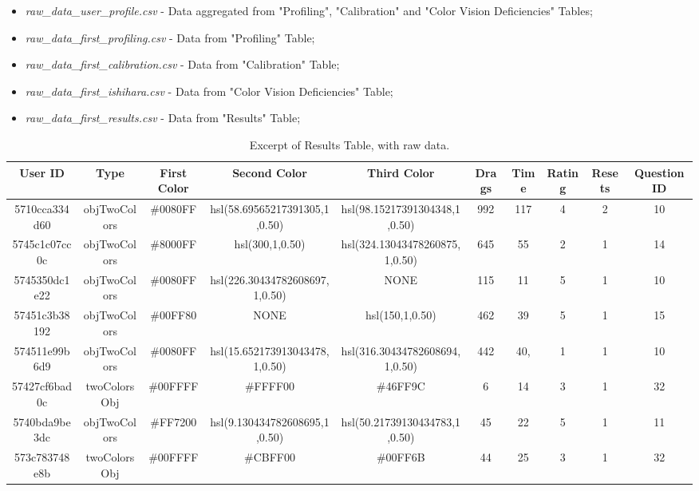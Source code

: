 %
\begin{itemize}
  \item \emph{raw\_data\_user\_profile.csv} - Data aggregated from "Profiling", "Calibration" and "Color Vision Deficiencies" Tables;
  \item \emph{raw\_data\_first\_profiling.csv} - Data from "Profiling" Table;
  \item \emph{raw\_data\_first\_calibration.csv} - Data from "Calibration" Table;
  \item \emph{raw\_data\_first\_ishihara.csv} - Data from "Color Vision Deficiencies" Table;
  \item \emph{raw\_data\_first\_results.csv} - Data from "Results" Table;
\end{itemize} \par
%
\begin{table}[htbp]
  \resizebox{\textwidth}{!} {
  \begin{tabular} {|c|c|c|c|c|c|c|c|c|c|}
    \hline
    User ID & Type & First Color & Second Color & Third Color & Drags & Time & Rating & Resets & Question ID \\ \hline \hline
    5710cca334d60 & objTwoColors & \#0080FF & hsl(58.69565217391305,1,0.50) & hsl(98.15217391304348,1,0.50) & 992 & 117 & 4 & 2 & 10 \\ \hline
    5745c1c07cc0c & objTwoColors & \#8000FF & hsl(300,1,0.50) & hsl(324.13043478260875,1,0.50) & 645 & 55 & 2 & 1 & 14 \\ \hline
    5745350dc1e22 & objTwoColors & \#0080FF & hsl(226.30434782608697,1,0.50) & NONE & 115 & 11 & 5 & 1 & 10 \\ \hline
    57451c3b38192 & objTwoColors & \#00FF80 & NONE & hsl(150,1,0.50) & 462 & 39 & 5 & 1 & 15 \\ \hline
    574511e99b6d9 & objTwoColors & \#0080FF & hsl(15.652173913043478,1,0.50) & hsl(316.30434782608694,1,0.50) & 442 & 40, & 1 & 1 & 10 \\ \hline
    57427cf6bad0c & twoColorsObj & \#00FFFF & \#FFFF00 & \#46FF9C & 6 & 14 & 3 & 1 & 32 \\ \hline
    5740bda9be3dc & objTwoColors & \#FF7200 & hsl(9.130434782608695,1,0.50) & hsl(50.21739130434783,1,0.50) & 45 & 22 & 5 & 1 & 11 \\ \hline
    573c783748e8b & twoColorsObj & \#00FFFF & \#CBFF00 & \#00FF6B & 44 & 25 & 3 & 1 & 32 \\
    \hline
  \end{tabular}}
  \caption[Excerpt of Raw "Results" Table]{Excerpt of Results Table, with raw data.}
  \label{table:csv_resultsraw}
\end{table} \par
